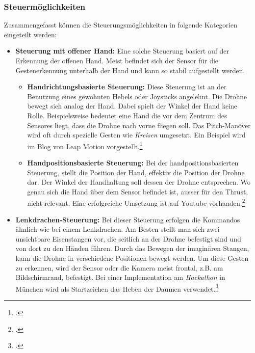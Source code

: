 \subsubsection{Steuermöglichkeiten}
Zusammengefasst können die Steuerungsmöglichkeiten in folgende Kategorien eingeteilt werden:
\begin{itemize}

	\item \textbf{Steuerung mit offener Hand:}
	Eine solche Steuerung basiert auf der Erkennung der offenen Hand.
	Meist befindet sich der Sensor für die Gestenerkennung unterhalb der Hand und kann so stabil aufgestellt werden.

		\begin{itemize}

			\item \textbf{Handrichtungsbasierte Steuerung:}
			Diese Steuerung ist an der Benutzung eines gewohnten Hebels oder Joysticks angelehnt. Die Drohne bewegt sich analog der Hand. Dabei spielt der Winkel der Hand keine Rolle.
			Beispielsweise bedeutet eine Hand die vor dem Zentrum des Sensores liegt, dass die Drohne nach vorne fliegen soll. Das Pitch-Manöver wird oft durch spezielle Gesten wie \textit{Kreisen} umgesetzt.
			Ein Beispiel wird im Blog von Leap Motion vorgestellt.\footcite{The_Beginning_of_a_Drone_Revolution_Leap_Motion_Blog_2015-04-29}

			\item \textbf{Handpositionsbasierte Steuerung:}
			Bei der handpositionsbasierten Steuerung, stellt die Position der Hand, effektiv die Position der Drohne dar. Der Winkel der Handhaltung soll dessen der Drohne entsprechen.
			Wo genau sich die Hand über dem Sensor befindet ist, ausser für den Thrust, nicht relevant.
			Eine erfolgreiche Umsetzung ist auf Youtube vorhanden.\footcite{Flying_the_Crazyflie_with_Leap_Motion_YouTube_2015-04-29}
		\end{itemize}

	\item \textbf{Lenkdrachen-Steuerung:}
	Bei dieser Steuerung erfolgen die Kommandos ähnlich wie bei einem Lenkdrachen.
	Am Besten stellt man sich zwei unsichtbare Eisenstangen vor, die seitlich an der Drohne befestigt sind und von dort zu den Händen führen. Durch das Bewegen der imaginären Stangen, kann die Drohne in verschiedene Positionen bewegt werden.
	Um diese Gesten zu erkennen, wird der Sensor oder die Kamera meist frontal, z.B. am Bildschirmrand, befestigt.
	Bei einer Implementation am \textit{Hackathon} in München wird als Startzeichen das Heben der Daumen verwendet.\footcite{Drones_Fly_Hands_Free_with_Gestural_Technology_2015-04-29}


\end{itemize}
